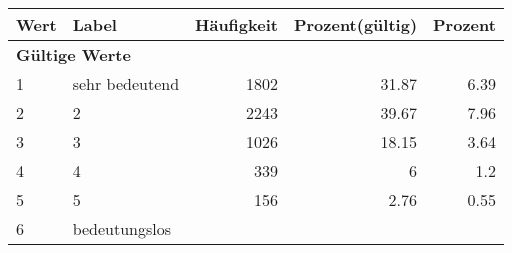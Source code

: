      \begin{longtable}{lXrrr}
     \toprule
     \textbf{Wert} & \textbf{Label} & \textbf{Häufigkeit} & \textbf{Prozent(gültig)} & \textbf{Prozent} \\
     \endhead
     \midrule
     \multicolumn{5}{l}{\textbf{Gültige Werte}}\\

     1 &
     \multicolumn{1}{X}{ sehr bedeutend   } &


       \num{1802} &
       \num[round-mode=places,round-precision=2]{31,87} &
         \num[round-mode=places,round-precision=2]{6,39} \\

     2 &
     \multicolumn{1}{X}{ 2   } &


       \num{2243} &
       \num[round-mode=places,round-precision=2]{39,67} &
         \num[round-mode=places,round-precision=2]{7,96} \\

     3 &
     \multicolumn{1}{X}{ 3   } &


       \num{1026} &
       \num[round-mode=places,round-precision=2]{18,15} &
         \num[round-mode=places,round-precision=2]{3,64} \\

     4 &
     \multicolumn{1}{X}{ 4   } &


       \num{339} &
       \num[round-mode=places,round-precision=2]{6} &
         \num[round-mode=places,round-precision=2]{1,2} \\

     5 &
     \multicolumn{1}{X}{ 5   } &


       \num{156} &
       \num[round-mode=places,round-precision=2]{2,76} &
         \num[round-mode=places,round-precision=2]{0,55} \\

     6 &
     \multicolumn{1}{X}{ bedeutungslos   } &



\end{longtable}
